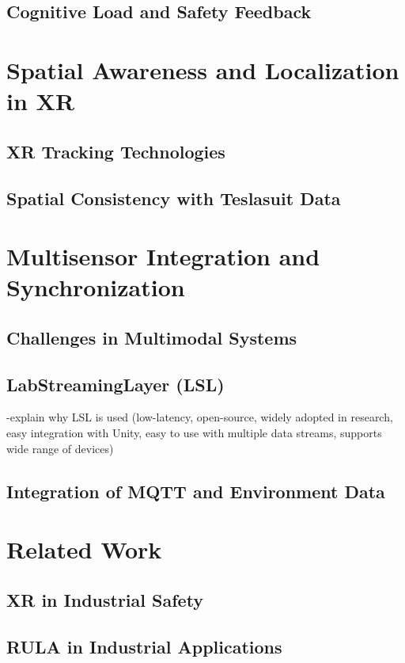 \subsection{Cognitive Load and Safety Feedback}

\section{Spatial Awareness and Localization in XR}
\subsection{XR Tracking Technologies}

\subsection{Spatial Consistency with Teslasuit Data}

\section{Multisensor Integration and Synchronization}
\subsection{Challenges in Multimodal Systems}

\subsection{LabStreamingLayer (LSL)}
-explain why LSL is used (low-latency, open-source, widely adopted in research, easy integration with Unity, easy to use with multiple data streams, supports wide range of devices)
\subsection{Integration of MQTT and Environment Data}

\section{Related Work}
\subsection{XR in Industrial Safety}
\subsection{RULA in Industrial Applications}
